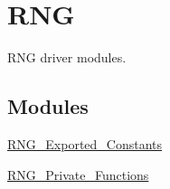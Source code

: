 \hypertarget{group___r_n_g}{\section{R\-N\-G}
\label{group___r_n_g}
}


R\-N\-G driver modules.  


\subsection*{Modules}
\begin{DoxyCompactItemize}
\item 
\hyperlink{group___r_n_g___exported___constants}{R\-N\-G\-\_\-\-Exported\-\_\-\-Constants}
\item 
\hyperlink{group___r_n_g___private___functions}{R\-N\-G\-\_\-\-Private\-\_\-\-Functions}
\end{DoxyCompactItemize}
